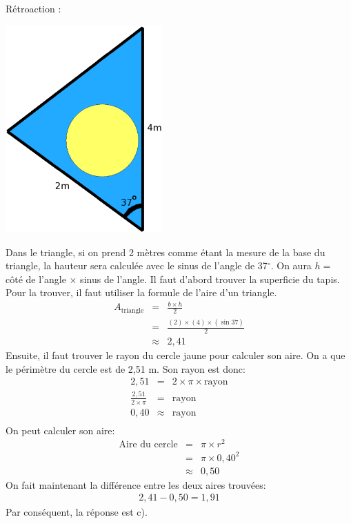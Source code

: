 \documentclass[letterpaper, 12pt]{article}
\begin{document}
R\'etroaction :\\
\begin{center}
 \includegraphics[width=6cm,bb=14 14 627 807]{Q2309.eps}
\end{center}
Dans le triangle, si on prend 2 m\`etres comme \'etant la mesure de la base du triangle, la hauteur sera calcul\'ee avec le sinus de l'angle de 37$^{\circ}$. On aura $h=$ c\^ot\'e de l'angle $\times$ sinus de l'angle.
Il faut d'abord trouver la superficie du tapis. Pour la trouver, il faut utiliser la formule de l'aire d'un triangle.
\begin{eqnarray*}
A_{\textrm{triangle}}&=&\frac{b\times h}{2}\\
&=&\frac{(2)\times(4)\times(\sin{37})}{2}\\
&\approx&2,41
\end{eqnarray*}
Ensuite, il faut trouver le rayon du cercle jaune pour calculer son aire. On a que le p\'erim\`etre du cercle est de 2,51 m. Son rayon est donc:
 \begin{eqnarray*}
2,51&=&2\times\pi\times\textrm{rayon}\\[2mm]
\frac{2,51}{2\times\pi}&=&\textrm{rayon}\\[2mm]
0,40&\approx&\textrm{rayon}\\
\end{eqnarray*}
On peut calculer son aire:
 \begin{eqnarray*}
\textrm{Aire du cercle}&=&\pi \times r^{2}\\
&=&\pi \times0,40^{2}\\
&\approx&0,50
\end{eqnarray*}
On fait maintenant la diff\'erence entre les deux aires trouv\'ees:
 \begin{eqnarray*}
2,41-0,50=1,91
\end{eqnarray*}
Par cons\'equent, la r\'eponse est c).\\
\end{document}
